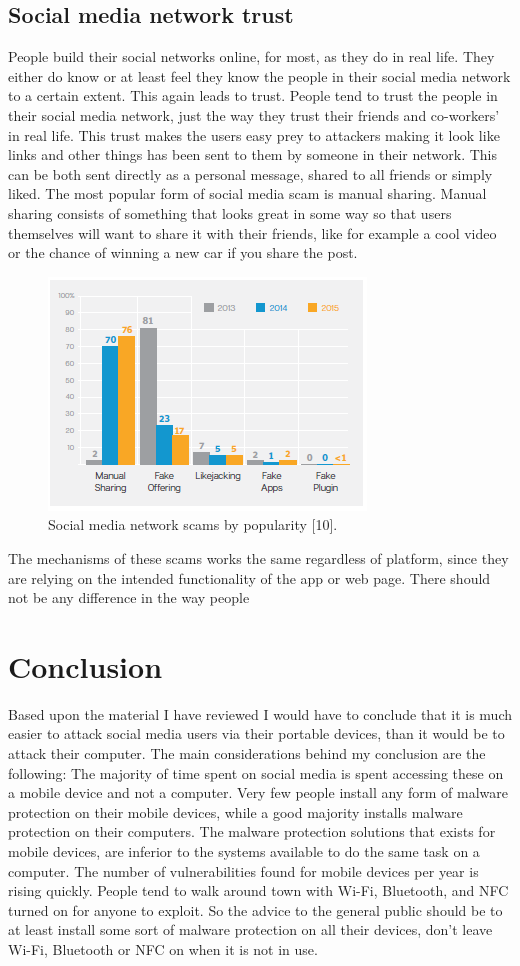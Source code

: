 \subsection{Social media network trust}
People build their social networks online, for most, as they do in real life. They either do know or at least feel they know the people in their social media network to a certain extent. This again leads to trust. People tend to trust the people in their social media network, just the way they trust their friends and co-workers’ in real life.
This trust makes the users easy prey to attackers making it look like links and other things has been sent to them by someone in their network. This can be both sent directly as a personal message, shared to all friends or simply liked. The most popular form of social media scam is manual sharing. Manual sharing consists of something that looks great in some way so that users themselves will want to share it with their friends, like for example a cool video or the chance of winning a new car if you share the post.
\begin{figure}
\centering
\includegraphics[width=0.5 \textwidth]{fig/social_media_scams}
\caption{Social media network scams by popularity [10].\label{fig:social_media_scams}}
\end{figure}
The mechanisms of these scams works the same regardless of platform, since they are relying on the intended functionality of the app or web page. There should not be any difference in the way people
\section{Conclusion}
Based upon the material I have reviewed I would have to conclude that it is much easier to attack social media users via their portable devices, than it would be to attack their computer. The main considerations behind my conclusion are the following: The majority of time spent on social media is spent accessing these on a mobile device and not a computer. Very few people install any form of malware protection on their mobile devices, while a good majority installs malware protection on their computers. The malware protection solutions that exists for mobile devices, are inferior to the systems available to do the same task on a computer. The number of vulnerabilities found for mobile devices per year is rising quickly. People tend to walk around town with Wi-Fi, Bluetooth, and NFC turned on for anyone to exploit.
So the advice to the general public should be to at least install some sort of malware protection on all their devices, don’t leave Wi-Fi, Bluetooth or NFC on when it is not in use.